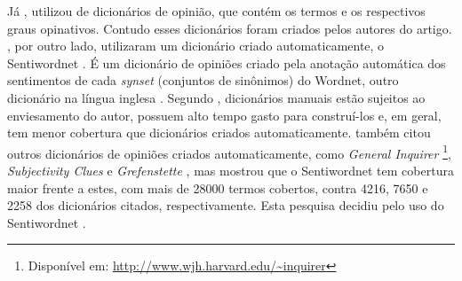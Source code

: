 \documentclass[template.tex]{subfiles}
\begin{document}

%
%

Já , utilizou de dicionários de opinião, que contém os termos e os respectivos graus opinativos. Contudo esses dicionários foram criados pelos autores do artigo. , por outro lado, utilizaram um dicionário criado automaticamente, o Sentiwordnet \cite{esuli2006sentiwordnet}. É um dicionário de opiniões criado pela anotação automática dos sentimentos de cada \textit{synset} (conjuntos de sinônimos) do Wordnet, outro dicionário na língua inglesa \cite{fellbaum2005wordnet}. Segundo , dicionários manuais estão sujeitos ao enviesamento do autor, possuem alto tempo gasto para construí-los e, em geral, tem menor cobertura que dicionários criados automaticamente.  também citou outros dicionários de opiniões criados automaticamente, como \textit{General Inquirer} \cite{stone1966general} \footnote{Disponível em: \url{http://www.wjh.harvard.edu/~inquirer}}, \textit{Subjectivity Clues} \cite{wilson2005recognizing} e \textit{Grefenstette} \cite{grefenstette2004coupling}, mas mostrou que o Sentiwordnet tem cobertura maior frente a estes, com mais de 28000 termos cobertos, contra 4216, 7650 e 2258 dos dicionários citados, respectivamente. Esta pesquisa decidiu pelo uso do Sentiwordnet \cite{esuli2006sentiwordnet}.
\end{document}
